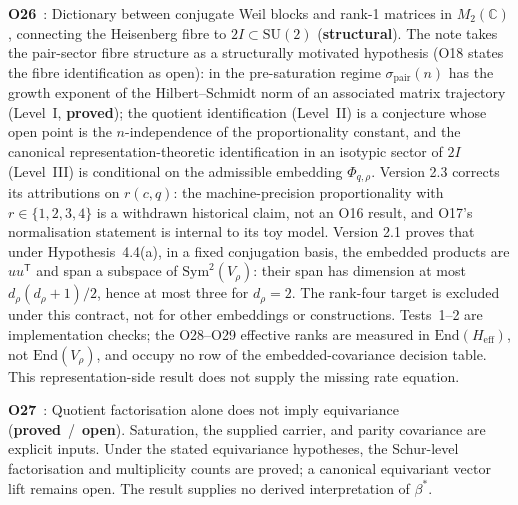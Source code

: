 \documentclass[11pt,a4paper]{article}
\newcommand{\SU}{\mathrm{SU}}
\newcommand{\sproved}{\textcolor{cproved}{\textbf{proved}}}
\newcommand{\sstruct}{\textcolor{cstruct}{\textbf{structural}}}
\newcommand{\sopen}{\textcolor{copen}{\textbf{open}}}
\begin{document}
    \textbf{O26}~\cite{Beau2026a30}: Dictionary between conjugate Weil blocks and rank-1 matrices in
    $M_2(\mathbb{C})$, connecting the Heisenberg fibre to $2I \subset \SU(2)$ (\sstruct).
    The note takes the pair-sector fibre structure as a structurally motivated hypothesis (O18 states
    the fibre identification as open): in the pre-saturation regime $\sigma_{\mathrm{pair}}(n)$ has the
    growth exponent of the Hilbert--Schmidt norm of an associated matrix trajectory (Level~I, \sproved);
    the quotient identification (Level~II) is a conjecture whose open point is the $n$-independence of
    the proportionality constant, and the canonical representation-theoretic identification in an
    isotypic sector of $2I$ (Level~III) is conditional on the admissible embedding
    $\Phi_{q,\rho}$.
    Version 2.3 corrects its attributions on $r(c,q)$: the machine-precision proportionality with
    $r\in\{1,2,3,4\}$ is a withdrawn historical claim, not an O16 result, and O17's normalisation
    statement is internal to its toy model.
    Version 2.1 proves that under Hypothesis~4.4(a), in a fixed conjugation basis, the embedded
    products are $uu^{\mathsf T}$ and span a subspace of $\mathrm{Sym}^2(V_\rho)$:
    their span has dimension at most $d_\rho(d_\rho+1)/2$, hence at most three for $d_\rho=2$.
    The rank-four target is excluded under this contract, not for other embeddings or constructions.
    Tests~1--2 are implementation checks; the O28--O29 effective ranks are measured in
    $\mathrm{End}(H_{\mathrm{eff}})$, not $\mathrm{End}(V_\rho)$, and occupy no row of the
    embedded-covariance decision table.
    This representation-side result does not supply the missing rate equation.

    \textbf{O27}~\cite{Beau2026a31}: Quotient factorisation alone does not imply equivariance
    (\sproved\ /\ \sopen). Saturation, the supplied
    carrier, and parity
    covariance are explicit inputs. Under the stated equivariance hypotheses, the Schur-level
    factorisation and multiplicity counts are proved; a canonical equivariant vector lift remains
    open. The result supplies no derived interpretation of $\beta^*$.
\end{document}
